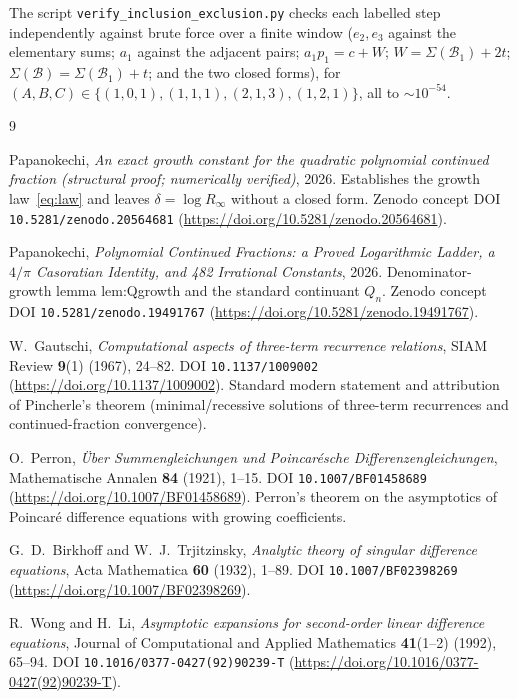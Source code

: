 \documentclass[11pt]{article}
\begin{document}
\noindent The script \texttt{verify\_inclusion\_exclusion.py} checks each labelled
step independently against brute force over a finite window
($e_2,e_3$ against the elementary sums; $a_1$ against the adjacent pairs;
$a_1p_1=c+W$; $W=\Sigma(\mathcal B_1)+2t$;
$\Sigma(\mathcal B)=\Sigma(\mathcal B_1)+t$; and the two closed forms), for
$(A,B,C)\in\{(1,0,1),(1,1,1),(2,1,3),(1,2,1)\}$, all to $\sim10^{-54}$.

\begin{thebibliography}{9}

Papanokechi,
\emph{An exact growth constant for the quadratic polynomial continued fraction
(structural proof; numerically verified)}, 2026.
Establishes the growth law~\eqref{eq:law} and leaves $\delta=\log R_\infty$ without
a closed form. Zenodo concept DOI \texttt{10.5281/zenodo.20564681}
(\url{https://doi.org/10.5281/zenodo.20564681}).

Papanokechi,
\emph{Polynomial Continued Fractions: a Proved Logarithmic Ladder, a $4/\pi$
Casoratian Identity, and 482 Irrational Constants}, 2026.
Denominator-growth lemma \textsf{lem:Qgrowth} and the standard continuant $Q_n$.
Zenodo concept DOI \texttt{10.5281/zenodo.19491767}
(\url{https://doi.org/10.5281/zenodo.19491767}).

W.~Gautschi,
\emph{Computational aspects of three-term recurrence relations},
SIAM Review \textbf{9}(1) (1967), 24--82. DOI \texttt{10.1137/1009002}
(\url{https://doi.org/10.1137/1009002}). Standard modern statement and attribution of
Pincherle's theorem (minimal/recessive solutions of three-term recurrences and
continued-fraction convergence).

O.~Perron,
\emph{\"Uber Summengleichungen und Poincar\'esche Differenzengleichungen},
Mathematische Annalen \textbf{84} (1921), 1--15. DOI \texttt{10.1007/BF01458689}
(\url{https://doi.org/10.1007/BF01458689}). Perron's theorem on the asymptotics of
Poincar\'e difference equations with growing coefficients.

G.~D.~Birkhoff and W.~J.~Trjitzinsky,
\emph{Analytic theory of singular difference equations},
Acta Mathematica \textbf{60} (1932), 1--89. DOI \texttt{10.1007/BF02398269}
(\url{https://doi.org/10.1007/BF02398269}).

R.~Wong and H.~Li,
\emph{Asymptotic expansions for second-order linear difference equations},
Journal of Computational and Applied Mathematics \textbf{41}(1--2) (1992), 65--94.
DOI \texttt{10.1016/0377-0427(92)90239-T}
(\url{https://doi.org/10.1016/0377-0427(92)90239-T}).


\end{thebibliography}
\end{document}
